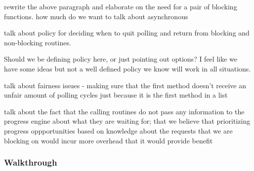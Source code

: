 \todo [BRT] rewrite the above paragraph and elaborate on the need for a pair
of blocking functions.  how much do we want to talk about asynchronous 

\todo talk about policy for deciding when to quit polling and return from
blocking and non-blocking routines.

\Q [BRT] Should we be defining policy here, or just pointing out options?  I
feel like we have some ideas but not a well defined policy we know will work in
all situations.  

\todo talk about fairness issues - making sure that the first method doesn't
receive an unfair amount of polling cycles just because it is the first method
in a list

\todo talk about the fact that the calling routines do not pass any information
to the progress engine about what they are waiting for; that we believe that
prioritizing progress oppportunities based on knowledge about the requests that
we are blocking on would incur more overhead that it would provide benefit


% 


\subsubsection{Walkthrough}
\label{sssec:walkthrough}

